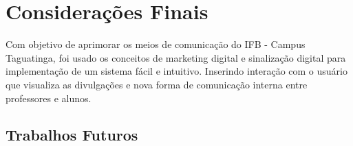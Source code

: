 \chapter[Considerações Finais]{Considerações Finais}
Com objetivo de aprimorar os meios de comunicação do IFB - Campus Taguatinga, foi usado os conceitos de marketing digital e sinalização digital para implementação de um sistema fácil e intuitivo. Inserindo interação com o usuário que visualiza as divulgações e nova forma de comunicação interna entre professores e alunos.  

\section{Trabalhos Futuros}

